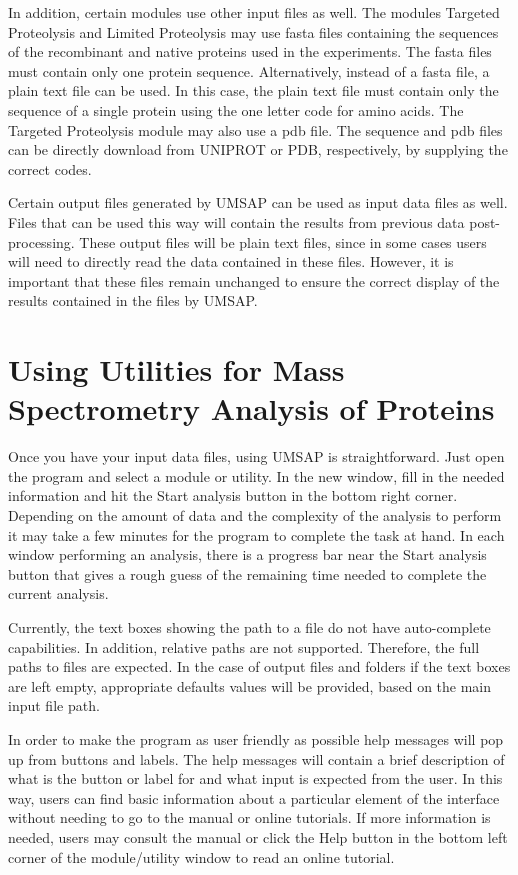 In addition, certain modules use other input files as well. The modules Targeted Proteolysis and Limited Proteolysis may use fasta files containing the sequences of the recombinant and native proteins used in the experiments. The fasta files must contain only one protein sequence. Alternatively, instead of a fasta file, a plain text file can be used. In this case, the plain text file must contain only the sequence of a single protein using the one letter code for amino acids. The Targeted Proteolysis module may also use a pdb file. The sequence and pdb files can be directly download from UNIPROT or PDB, respectively,  by supplying the correct codes.

Certain output files generated by UMSAP can be used as input data files as well. Files that can be used this way will contain the results from previous data post-processing. These output files will be plain text files, since in some cases users will need to directly read the data contained in these files. However, it is important that these files remain unchanged to ensure the correct display of the results contained in the files by UMSAP.

\section{Using Utilities for Mass Spectrometry Analysis of Proteins}

Once you have your input data files, using UMSAP is straightforward. Just open the program and select a module or utility. In the new window, fill in the needed information and hit the Start analysis button in the bottom right corner. Depending on the amount of data and the complexity of the analysis to perform it may take a few minutes for the program to complete the task at hand. In each window performing an analysis, there is a progress bar near the Start analysis button that gives a rough guess of the remaining time needed to complete the current analysis.

Currently, the text boxes showing the path to a file  do not have auto-complete capabilities. In addition, relative paths are not supported. Therefore, the full paths to files are expected. In the case of output files and folders if the text boxes are left empty, appropriate defaults values will be provided, based on the main input file path.  

In order to make the program as user friendly as possible help messages will pop up from buttons and labels. The help messages will contain a brief description of what is the button or label for and what input is expected from the user. In this way, users can find basic information about a particular element of the interface without needing to go to the manual or online tutorials. If more information is needed, users may consult the manual or click the Help button in the bottom left corner of the module/utility window to read an online tutorial. 

